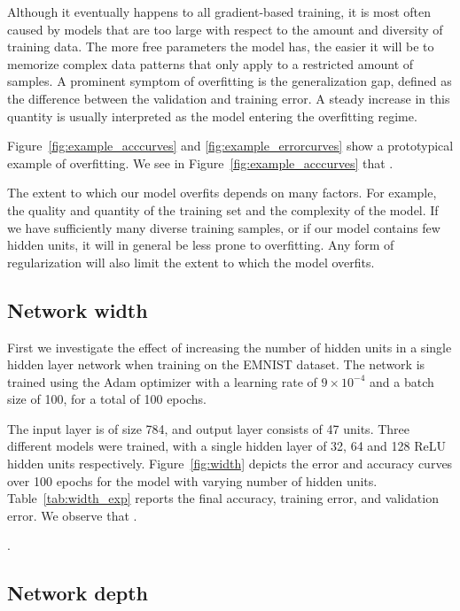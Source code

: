 \documentclass{article}
\begin{document}
Although it eventually happens to all gradient-based training, it is most often caused by models that are too large with respect to the amount and diversity of training data. The more free parameters the model has, the easier it will be to memorize complex data patterns that only apply to a restricted amount of samples.
A prominent symptom of overfitting is the generalization gap, defined as the difference between the validation and training error. 
A steady increase in this quantity is usually interpreted as the model entering the overfitting regime.


Figure~\ref{fig:example_acccurves} and \ref{fig:example_errorcurves} show a prototypical example of overfitting.
We see in Figure~\ref{fig:example_acccurves} that \questionOne.

The extent to which our model overfits depends on many factors.
For example, the quality and quantity of the training set and the complexity of the model. 
If we have sufficiently many diverse training samples, or if our model contains few hidden units, it will in general be less prone to overfitting. 
Any form of regularization will also limit the extent to which the model overfits.


\subsection{Network width}

\questionTableOne
\questionFigureTwo

First we investigate the effect of increasing the number of hidden units in a single hidden layer network when training on the EMNIST dataset.
The network is trained using the Adam optimizer
with a learning rate of $9 \times 10^{-4}$ and a batch size of 100, for a total of 100 epochs.

The input layer is of size 784, and output layer consists of 47 units. 
Three different models were trained, with a single hidden layer of 32, 64 and 128 ReLU hidden units respectively.
Figure~\ref{fig:width} depicts the error and accuracy curves over 100 epochs for the model with varying number of hidden units.
Table~\ref{tab:width_exp} reports the final accuracy, training error, and validation error.
We observe that \questionTwo.

\questionThree.


\subsection{Network depth}
\end{document}
